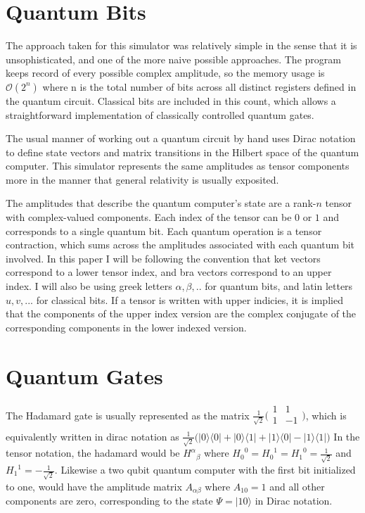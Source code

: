 \documentclass[%
 reprint,
 amsmath,amssymb,
 aps,
]{revtex4-2}
\begin{document}
\section{\label{sec:level1} \label{qubits} Quantum Bits}
The approach taken for this simulator was relatively simple in the sense that it is unsophisticated, and one of the more naive possible approaches. The program keeps record of every possible complex amplitude, so the memory usage is $\mathcal{O}(2^n)$ where n is the total number of bits across all distinct registers defined in the quantum circuit. Classical bits are included in this count, which allows a straightforward implementation of classically controlled quantum gates.

The usual manner of working out a quantum circuit by hand uses Dirac notation to define state vectors and matrix transitions in the Hilbert space of the quantum computer. This simulator represents the same amplitudes as tensor components more in the manner that general relativity is usually exposited. 

The amplitudes that describe the quantum computer's state are a rank-$n$ tensor with complex-valued components. Each index of the tensor can be $0$ or $1$ and corresponds to a single quantum bit\cite{kattemolleQuantum}. Each quantum operation is a tensor contraction, which sums across the amplitudes associated with each quantum bit involved. In this paper I will be following the convention that ket vectors correspond to a lower tensor index, and bra vectors correspond to an upper index. I will also be using greek letters $\alpha, \beta, ..$ for quantum bits, and latin letters $u, v,...$ for classical bits. If a tensor is written with upper indicies, it is implied that the components of the upper index version are the complex conjugate of the corresponding components in the lower indexed version.

\section{\label{sec:level1} \label{gates} Quantum Gates}
The Hadamard gate is usually represented as the matrix $\frac{1}{\sqrt{2}}\big(\begin{smallmatrix}
1 & 1\\
1 & -1\\
\end{smallmatrix}\big)$, which is equivalently written in dirac notation as $\frac{1}{\sqrt{2}} \big( |0\rangle\langle0| + |0\rangle\langle1| + |1\rangle\langle0| - |1\rangle\langle1|\big)$ In the tensor notation, the hadamard would be ${H^{\alpha}}_{\beta}$ where ${H_{0}}^{0} = {H_{0}}^{1} = {H_{1}}^{0} = \frac{1}{\sqrt{2}}$ and ${H_{1}}^{1} = -\frac{1}{\sqrt{2}}$. Likewise a two qubit quantum computer with the first bit initialized to one, would have the amplitude matrix $A_{\alpha\beta}$ where $A_{10} = 1$ and all other components are zero, corresponding to the state $\Psi = |10\rangle$ in Dirac notation. 
\end{document}
